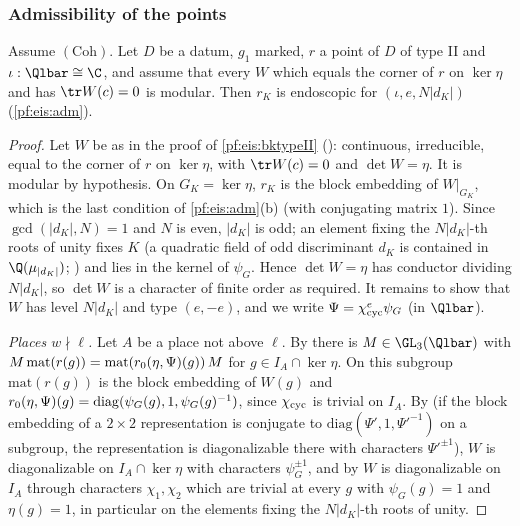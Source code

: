 \subsubsection{Admissibility of the points}

\begin{lemma}\label{pf:eis:admII}
Assume $(\mathrm{Coh})$. Let $D$ be a datum, $g_1$ marked, $r$ a point of $D$ of type II and $\iota:\Qlbar\cong\C$, and assume
that every $W$ which equals the corner of $r$ on $\ker\eta$ and has $\tr W(c)=0$ is modular. Then $r_K$ is endoscopic for
$(\iota,e,N|d_K|)$ (\cref{pf:eis:adm}).
\end{lemma}

\begin{proof}
Let $W$ be as in the proof of \cref{pf:eis:bktypeII} (): continuous, irreducible, equal
to the corner of $r$ on $\ker\eta$, with $\tr W(c)=0$ and $\det W=\eta$. It is modular by hypothesis. On $G_K=\ker\eta$, $r_K$ is the
block embedding of $W|_{G_K}$, which is the last condition of \cref{pf:eis:adm}(b) (with conjugating matrix $1$). Since
$\gcd(|d_K|,N)=1$ and $N$ is even, $|d_K|$ is odd; an element fixing the $N|d_K|$-th roots of unity fixes $K$ (a quadratic field of odd
discriminant $d_K$ is contained in $\Q(\mu_{|d_K|})$; ) and lies
in the kernel of $\psi_G$. Hence $\det W=\eta$ has conductor
dividing $N|d_K|$, so $\det W$ is a character of finite order as required. It remains to show that $W$ has level $N|d_K|$ and
type $(e,-e)$, and we write $\Psi=\chi_{\mathrm{cyc}}^e\psi_G$ (in $\Qlbar$).

\emph{Places $w\nmid\ell$.} Let $A$ be a place not above $\ell$. By  there is
$M\in\GL_3(\Qlbar)$ with $M\,\mathrm{mat}(r(g))=\mathrm{mat}(r_0(\eta,\Psi)(g))\,M$ for $g\in I_A\cap\ker\eta$. On this subgroup
$\mathrm{mat}(r(g))$ is the block embedding of $W(g)$ and $r_0(\eta,\Psi)(g)=\mathrm{diag}(\psi_G(g),1,\psi_G(g)^{-1})$, since $\chi_{\mathrm{cyc}}$
is trivial on $I_A$. By  (if the block embedding of a $2\times2$
representation is conjugate to $\mathrm{diag}(\Psi',1,\Psi'^{-1})$ on a subgroup, the representation is diagonalizable there with
characters $\Psi'^{\pm1}$), $W$ is diagonalizable on $I_A\cap\ker\eta$ with characters $\psi_G^{\pm1}$, and by
 $W$ is diagonalizable on $I_A$ through characters $\chi_1,\chi_2$
which are trivial at every $g$ with $\psi_G(g)=1$ and $\eta(g)=1$, in particular on the elements fixing the $N|d_K|$-th roots of
unity.


\end{proof}
